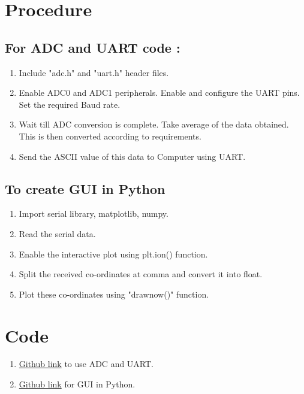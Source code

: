 \documentclass[a4paper,12pt,oneside]{book}
\begin{document}
\section {Procedure}

\subsection{ For ADC and UART code :}
\begin{enumerate}
\item Include "adc.h" and "uart.h" header files.
\item Enable ADC0 and ADC1 peripherals. Enable and configure the UART pins. Set the required Baud rate.
\item Wait till ADC conversion is complete. Take average of the data obtained. This is then converted according to requirements. 
\item Send the ASCII value of this data to Computer using UART.
\end{enumerate}
\subsection{To create GUI in Python}
\begin{enumerate}
\item Import serial library, matplotlib, numpy.
\item Read the serial data.
\item Enable the interactive plot using plt.ion() function.
\item Split the received co-ordinates at comma and convert it into float.
\item Plot these co-ordinates using "drawnow()" function.    
\end{enumerate}


\section{Code}
\begin{enumerate}
\item \href{https://github.com/eYSIP-2016/eYSIP-2016-Around-the-world-of-Embedded-Systems/blob/origin/master/Solutions/lab4\%20solutions/lab4_solution.c}{Github link} to use ADC and UART.
\item \href{https://github.com/eYSIP-2016/eYSIP-2016-Around-the-world-of-Embedded-Systems/blob/origin/master/Solutions/lab4\%20solutions/gui.py}{Github link} for GUI in Python.
\end{enumerate}
\end{document}
